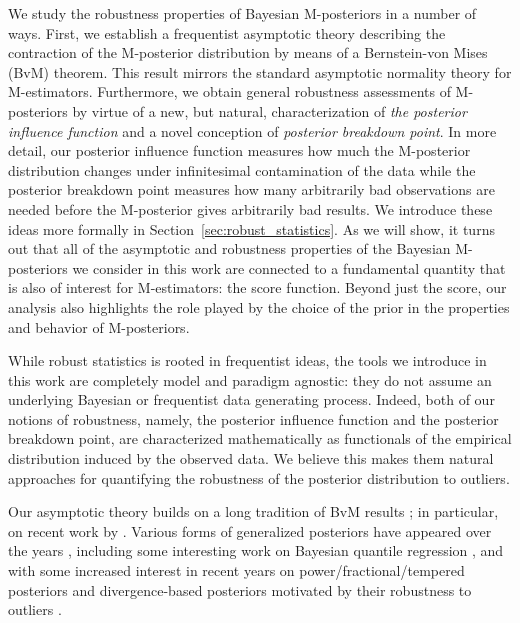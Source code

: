\documentclass[11pt, oneside]{amsart}
\theoremstyle{definition}   %
\begin{document}
We study the robustness properties of Bayesian M-posteriors in a number of ways. First, we establish a frequentist  asymptotic theory describing the contraction of the M-posterior distribution by means of a Bernstein-von Mises (BvM) theorem. This result mirrors the standard asymptotic normality theory for M-estimators. Furthermore, we obtain general robustness assessments of M-posteriors by virtue of a new, but natural, characterization of \emph{the posterior influence function} and a novel conception of \emph{posterior breakdown point}. 
In more detail, our posterior influence function measures how much the M-posterior distribution  changes under infinitesimal contamination of the data while the posterior breakdown point measures how many arbitrarily bad observations are needed before the M-posterior gives arbitrarily bad results. We introduce these ideas more formally in Section~\ref{sec:robust_statistics}.
As we will show, it turns out that all of the asymptotic and robustness properties of the Bayesian M-posteriors we consider in this work are connected to a fundamental quantity that is also of interest for M-estimators: the score function. Beyond just the score, our analysis also highlights the role played by the choice of the prior in the properties and behavior  of M-posteriors.  


While robust statistics is rooted in frequentist ideas,  the tools we introduce in this work are completely model and paradigm agnostic:  they do not assume an underlying Bayesian or frequentist data generating process. Indeed,  both of our notions of robustness, namely, the posterior influence function and the posterior breakdown point, are characterized mathematically as  functionals of the empirical distribution induced by the observed data. We  believe this makes them
natural approaches for quantifying the robustness of the posterior distribution  to outliers.

Our asymptotic theory builds on a long tradition of BvM results \citep{lecam1953,freedman1963,Vaart_1998}; in particular, on recent work by \cite{chernozhukov:hong2003,kleijn:vandervaart2012,wang:blei2019-JASA, miller2021,avellamedinaetal2021}. Various forms of generalized posteriors have appeared over the years \citep{zhang1999,chernozhukov:hong2003,bissiri:holmes:walker2016}, including some interesting work on Bayesian quantile regression \citep{yu:moyeed2001,yang:wang:he2016}, and with some increased  interest in recent years on power/fractional/tempered posteriors \citep{grunwald2012, grunwald:ommen2017, holmes:walker2017,higginsetal2017,  miller:dunson2019, avellamedinaetal2021,ruchira,mclatchie:fong:frazier:knoblauch2025} and divergence-based posteriors motivated by their robustness to outliers \citep{hooker:vidyashankar2014,ghosh:basu2016,nakagawa:hashimoto2020,matsubara:knoblauch:briol:oates2022, altamirano:briol:knoblauch2023}. 
\end{document}
